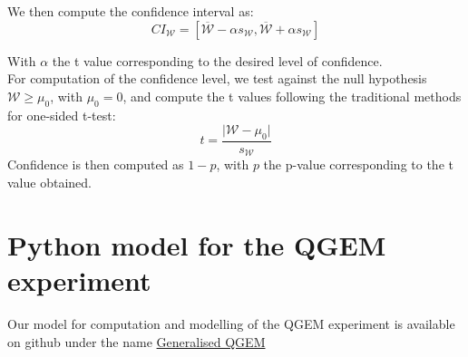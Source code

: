 \documentclass[%
 reprint,
 superscriptaddress,
 amsmath,
 amssymb,
 aps,
 longbibliography
]{revtex4-2}
\begin{document}
\begin{appendices}
We then compute the confidence interval as: 
 \begin{equation}
    CI_\mathcal{W} = [\overline{\mathcal{W}} - \alpha s_{\mathcal{W}}, \overline{\mathcal{W}} + \alpha s_{\mathcal{W}}  ]
\end{equation}

\indent With $\alpha$ the t value corresponding to the desired level of confidence. \\
\indent For computation of the confidence level, we test against the null hypothesis $\mathcal{W} \ge \mu_0$, with $\mu_0 = 0$, and compute the t values following the traditional methods for one-sided t-test: 
 \begin{equation}
    t =\frac{\lvert \mathcal{W} - \mu_0 \rvert }{s_{\mathcal{W}}}
\end{equation}
\indent Confidence is then computed as $1 - p$, with $p$ the p-value corresponding to the t value obtained. \\

\section{Python model for the QGEM experiment} \label{sec:python}

\indent Our model for computation and modelling of the QGEM experiment is available on github under the name \href{https://github.com/JT76/Generalised_QGEM}{Generalised QGEM}



\end{appendices}
\end{document}
